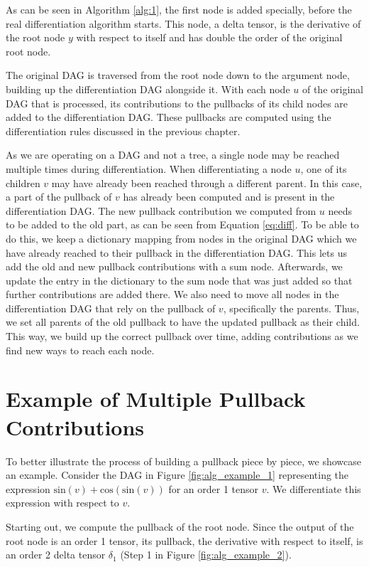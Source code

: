 \documentclass[12pt, a4paper]{report} %
\begin{document}
As can be seen in Algorithm \ref{alg:1}, the first node is added specially, before the real differentiation algorithm starts.
This node, a delta tensor, is the derivative of the root node $y$ with respect to itself and has double the order of the original root node.

The original DAG is traversed from the root node down to the argument node, building up the differentiation DAG alongside it.
With each node $u$ of the original DAG that is processed, its contributions to the pullbacks of its child nodes are added to the differentiation DAG.
These pullbacks are computed using the differentiation rules discussed in the previous chapter.

As we are operating on a DAG and not a tree, a single node may be reached multiple times during differentiation.
When differentiating a node $u$, one of its children $v$ may have already been reached through a different parent.
In this case, a part of the pullback of $v$ has already been computed and is present in the differentiation DAG.
The new pullback contribution we computed from $u$ needs to be added to the old part, as can be seen from Equation \ref{eq:diff}.
To be able to do this, we keep a dictionary mapping from nodes in the original DAG which we have already reached to their pullback in the differentiation DAG.
This lets us add the old and new pullback contributions with a sum node.
Afterwards, we update the entry in the dictionary to the sum node that was just added so that further contributions are added there.
We also need to move all nodes in the differentiation DAG that rely on the pullback of $v$, specifically the parents.
Thus, we set all parents of the old pullback to have the updated pullback as their child.
This way, we build up the correct pullback over time, adding contributions as we find new ways to reach each node.

\FloatBarrier
\section{Example of Multiple Pullback Contributions}
To better illustrate the process of building a pullback piece by piece, we showcase an example.
Consider the DAG in Figure \ref{fig:alg_example_1} representing the expression $\text{sin}(v) + \text{cos}(\text{sin}(v))$ for an order 1 tensor $v$.
We differentiate this expression with respect to $v$.

Starting out, we compute the pullback of the root node.
Since the output of the root node is an order 1 tensor, its pullback, the derivative with respect to itself, is an order 2 delta tensor $\delta_1$ (Step 1 in Figure \ref{fig:alg_example_2}).
\end{document}
